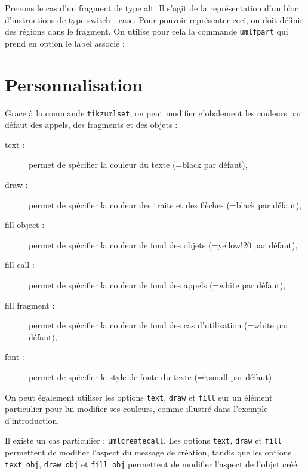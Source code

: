 \documentclass[a4paper,11pt]{report}
\newcommand{\inputTikZ}[1]{%
  }%
\newcommand{\inputTikZ}[1]{%
    \texttt{[image: fig/\#1.pdf]}%
  }%
\begin{document}
Prenons le cas d'un fragment de type alt. Il s'agit de la représentation d'un bloc d'instructions de type switch - case. Pour pouvoir représenter ceci, on doit définir des régions dans le fragment. On utilise pour cela la commande {\tt umlfpart} qui prend en option le label associé :

\medskip

\begin{minipage}{0.5\textwidth}

\end{minipage}
\begin{minipage}{0.5\textwidth}
\begin{center}
\inputTikZ{fragmentpart}
\end{center}
\end{minipage}

\section{Personnalisation}\label{s.fitseq}

Grace à la commande {\tt tikzumlset}, on peut modifier globalement les couleurs par défaut des appels, des fragments et des objets :

\begin{description}
\item[text :] permet de spécifier la couleur du texte (=black par défaut),
\item[draw :] permet de spécifier la couleur des traits et des flèches (=black par défaut),
\item[fill object :] permet de spécifier la couleur de fond des objets (=yellow!20 par défaut),
\item[fill call :] permet de spécifier la couleur de fond des appels (=white par défaut),
\item[fill fragment :] permet de spécifier la couleur de fond des cas d'utilisation (=white par défaut),
\item[font :] permet de spécifier le style de fonte du texte (=$\backslash$small par défaut).
\end{description}

On peut également utiliser les options {\tt text}, {\tt draw} et {\tt fill} sur un élément particulier pour lui modifier ses couleurs, comme illustré dans l'exemple d'introduction. 

Il existe un cas particulier : {\tt umlcreatecall}. Les options {\tt text}, {\tt draw} et {\tt fill} permettent de modifier l'aspect du message de création, tandis que les options {\tt text obj}, {\tt draw obj} et {\tt fill obj} permettent de modifier l'aspect de l'objet créé.
\end{document}
